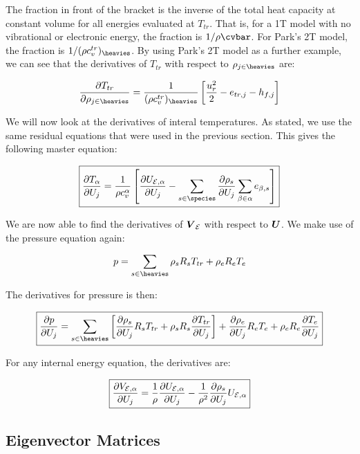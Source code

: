 \documentclass[10pt]{article}
\begin{document}
\begin{flushleft}
The fraction in front of the bracket is the inverse of the total heat capacity at constant volume for all energies evaluated at $T_{tr}$. That is, for a 1T model with no vibrational or electronic energy, the fraction is $1 / \rho \cvbar$. For Park's 2T model, the fraction is $1 / (\rho c_v^{tr})_{\heavies}$. By using Park's 2T model as a further example, we can see that the derivatives of $T_{tr}$ with respect to $\rho_{j \in \heavies}$ are:

\begin{equation*}
    \pd{T_{tr}}{\rho_{j \in \heavies}} = \frac{1}{(\rho c_v^{tr})_{\heavies}} \bb{\frac{u_r^2}{2} - e_{tr,j} - h_{f,j}}
\end{equation*}

We will now look at the derivatives of interal temperatures. As stated, we use the same residual equations that were used in the previous section. This gives the following master equation:

\begin{equation*}
    \boxed{\pd{T_{\alpha}}{U_j} = \frac{1}{\rho c_v^\alpha} \bb{\pd{U_{\mathcal{E},\alpha}}{U_j} - \sum_{s \in \species} \pd{\rho_s}{U_j} \sum_{\beta \in \alpha} e_{\beta,s}}}
\end{equation*}

We are now able to find the derivatives of $\boldsymbol{V}_{\mathcal{E}}$ with respect to $\boldsymbol{U}$. We make use of the pressure equation again:

\begin{equation*}
    p = \sum_{s \in \heavies} \rho_s R_s T_{tr} + \rho_e R_e T_e
\end{equation*}

The derivatives for pressure is then:

\begin{equation}
    \boxed{\pd{p}{U_j} = \sum_{s \in \heavies} \bb{\pd{\rho_s}{U_j} R_s T_{tr} + \rho_s R_s \pd{T_{tr}}{U_j}} + \pd{\rho_e}{U_j} R_e T_e + \rho_e R_e \pd{T_e}{U_j}}
\end{equation}

For any internal energy equation, the derivatives are:

\begin{equation}
    \boxed{\frac{\partial V_{\mathcal{E},\alpha}}{\partial U_j} = \frac{1}{\rho} \frac{\partial U_{\mathcal{E},\alpha}}{\partial U_j} - \frac{1}{\rho^2} \frac{\partial \rho_s}{\partial U_j} U_{\mathcal{E},\alpha}}
\end{equation}

\subsection{Eigenvector Matrices}


\end{flushleft}
\end{document}
